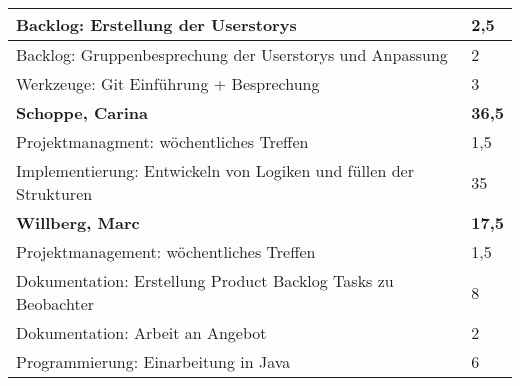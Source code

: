 \documentclass[a4paper,11pt]{scrartcl}
\begin{document}
\begin{longtable}{| p{13.8cm} | C{2.4cm} |}
  Backlog: Erstellung der Userstorys
	&
  2,5
	\\
	\hline

  Backlog: Gruppenbesprechung der Userstorys und Anpassung
	&
  2
	\\
	\hline

  Werkzeuge: Git Einführung + Besprechung
	&
  3
	\\
	\hline
	\hline


	\textbf{Schoppe, Carina} & \textbf{36,5}\\ %
	\hline

  Projektmanagment: wöchentliches Treffen
	&
  1,5
	\\
	\hline

  Implementierung: Entwickeln von Logiken und füllen der Strukturen
	&
  35
	\\
	\hline
	\hline


	\textbf{Willberg, Marc} & \textbf{17,5}\\ %
	\hline

  Projektmanagement: wöchentliches Treffen
	&
  1,5
	\\
	\hline

  Dokumentation: Erstellung Product Backlog Tasks zu Beobachter
	&
  8
	\\
	\hline

  Dokumentation: Arbeit an Angebot
	&
  2
	\\
	\hline

  Programmierung: Einarbeitung in Java
	&
  6
	\\
	\hline

\end{longtable}
\end{document}
